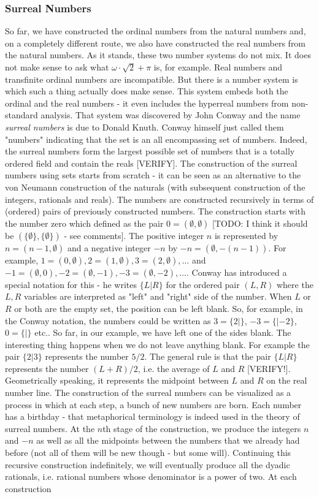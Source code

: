 \subsubsection{Surreal Numbers}
So far, we have constructed the ordinal numbers from the natural numbers and, on a completely different route, we also have constructed the real numbers from the natural numbers. As it stands, these two number systems do not mix. It does not make sense to ask what $\omega \cdot \sqrt{2} + \pi$ is, for example. Real numbers and transfinite ordinal numbers are incompatible. But there is a number system is which such a thing actually does make sense. This system embeds both the ordinal and the real numbers - it even includes the hyperreal numbers from non-standard analysis. That system was discovered by John Conway and the name \emph{surreal numbers} is due to Donald Knuth. Conway himself just called them "numbers" indicating that the set is an all encompassing set of numbers. Indeed, the surreal numbers form the largest possible set of numbers that is a totally ordered field and contain the reals [VERIFY]. The construction of the surreal numbers using sets starts from scratch - it can be seen as an alternative to the von Neumann construction of the naturals (with subsequent construction of the integers, rationals and reals). The numbers are constructed recursively in terms of (ordered) pairs of previously constructed numbers. The construction starts with the number zero which defined as the pair $0 = (\emptyset, \emptyset)$ [TODO: I think it should be $(\{\emptyset\},\{\emptyset\})$ - see comments]. The positive integer $n$ is represented by $n = (n-1,\emptyset)$ and a negative integer $-n$ by $-n = (\emptyset, -(n-1))$. For example, $1=(0,\emptyset), 2=(1,\emptyset), 3=(2,\emptyset), \ldots$ and $-1=(\emptyset,0), -2=(\emptyset,-1), -3=(\emptyset,-2), \ldots$. Conway has introduced a special notation for this - he writes $\{L|R\}$ for the ordered pair $(L,R)$ where the $L,R$ variables are interpreted as "left" and "right" side of the number. When $L$ or $R$ or both are the empty set, the position can be left blank. So, for example, in the Conway notation, the numbers could be written as $3=\{2|\}$, $-3=\{|-2\}$,  $0=\{|\}$ etc.. So far, in our example, we have left one of the sides blank. The interesting thing happens when we do not leave anything blank. For example the pair $\{2|3\}$ represents the number $5/2$. The general rule is that the pair $\{L|R\}$ represents the number $(L+R)/2$, i.e. the average of $L$ and $R$ [VERIFY!]. Geometrically speaking, it represents the midpoint between $L$ and $R$ on the real number line. The construction of the surreal numbers can be visualized as a process in which at each step, a bunch of new numbers are born. Each number has a birthday - that metaphorical terminology is indeed used in the theory of surreal numbers. At the $n$th stage of the construction, we produce the integers $n$ and $-n$ as well as all the midpoints between the numbers that we already had before (not all of them will be new though - but some will). Continuing this recursive construction indefinitely, we will eventually produce all the dyadic rationals, i.e. rational numbers whose denominator is a power of two. At each construction 